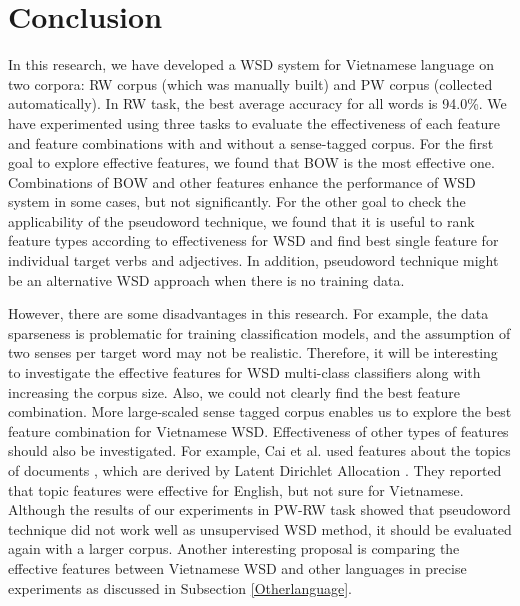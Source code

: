\documentclass[english]{jnlp_1.4}
\begin{document}
\section{Conclusion} \label{section:conclude}
In this research, we have developed a WSD system for Vietnamese language on two corpora: 
RW corpus (which was manually built) and PW corpus (collected automatically). 
In RW task, the best average accuracy for all words is 94.0\%.
We have experimented using three tasks to evaluate the effectiveness of each feature and feature combinations with and without a sense-tagged corpus.
For the first goal to explore effective features, we found that BOW is the most effective one.
Combinations of BOW and other features enhance the performance of WSD system
in some cases, but not significantly.
For the other goal to check the applicability of the pseudoword technique, 
we found that it is 
useful to rank feature types according to effectiveness for WSD 
and find best single feature for individual target verbs and adjectives.
In addition, pseudoword technique might be an alternative WSD approach when there is no training data.

However, there are some disadvantages in this research. 
For example, the data sparseness is problematic for training classification models, 
and the assumption of two senses per target word may not be realistic. 
Therefore, it will be interesting to investigate the effective features for WSD multi-class classifiers along with increasing the corpus size. 
Also, we could not clearly find the best feature combination. 
More large-scaled sense tagged corpus enables us to explore the best feature combination for Vietnamese WSD.
Effectiveness of other types of features should also be investigated. 
For example, Cai et al. used features about the topics of documents \cite{cai:07:a}, 
which are derived by Latent Dirichlet Allocation \cite{blei:03:a}. 
They reported that topic features were effective for English, but not sure for Vietnamese.
Although the results of our experiments in PW-RW task showed that pseudoword technique did not work well as unsupervised WSD method, 
it should be evaluated again with a larger corpus.
Another interesting proposal is comparing the effective features between Vietnamese WSD and other languages
in precise experiments as discussed in Subsection \ref{Otherlanguage}.
\end{document}
